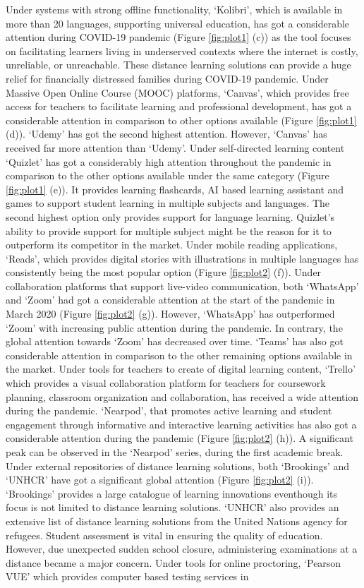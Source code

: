 \documentclass[11pt,a4paper,]{article}
\begin{document}
Under systems with strong offline functionality, `Kolibri', which is available in more than 20 languages, supporting universal education, has got a considerable attention during COVID-19 pandemic (Figure \ref{fig:plot1} (c)) as the tool focuses on facilitating learners living in underserved contexts where the internet is costly, unreliable, or unreachable. These distance learning solutions can provide a huge relief for financially distressed families during COVID-19 pandemic. Under Massive Open Online Course (MOOC) platforms, `Canvas', which provides free access for teachers to facilitate learning and professional development, has got a considerable attention in comparison to other options available (Figure \ref{fig:plot1} (d)). `Udemy' has got the second highest attention. However, `Canvas' has received far more attention than `Udemy'. Under self-directed learning content `Quizlet' has got a considerably high attention throughout the pandemic in comparison to the other options available under the same category (Figure \ref{fig:plot1} (e)). It provides learning flashcards, AI based learning assistant and games to support student learning in multiple subjects and languages. The second highest option only provides support for language learning. Quizlet's ability to provide support for multiple subject might be the reason for it to outperform its competitor in the market. Under mobile reading applications, `Reads', which provides digital stories with illustrations in multiple languages has consistently being the most popular option (Figure \ref{fig:plot2} (f)). Under collaboration platforms that support live-video communication, both `WhatsApp' and `Zoom' had got a considerable attention at the start of the pandemic in March 2020 (Figure \ref{fig:plot2} (g)). However, `WhatsApp' has outperformed `Zoom' with increasing public attention during the pandemic. In contrary, the global attention towards `Zoom' has decreased over time. `Teams' has also got considerable attention in comparison to the other remaining options available in the market. Under tools for teachers to create of digital learning content, `Trello' which provides a visual collaboration platform for teachers for coursework planning, classroom organization and collaboration, has received a wide attention during the pandemic. `Nearpod', that promotes active learning and student engagement through informative and interactive learning activities has also got a considerable attention during the pandemic (Figure \ref{fig:plot2} (h)). A significant peak can be observed in the `Nearpod' series, during the first academic break. Under external repositories of distance learning solutions, both `Brookings' and `UNHCR' have got a significant global attention (Figure \ref{fig:plot2} (i)). `Brookings' provides a large catalogue of learning innovations eventhough its focus is not limited to distance learning solutions. `UNHCR' also provides an extensive list of distance learning solutions from the United Nations agency for refugees. Student assessment is vital in ensuring the quality of education. However, due unexpected sudden school closure, administering examinations at a distance became a major concern. Under tools for online proctoring, `Pearson VUE' which provides computer based testing services in
\end{document}
